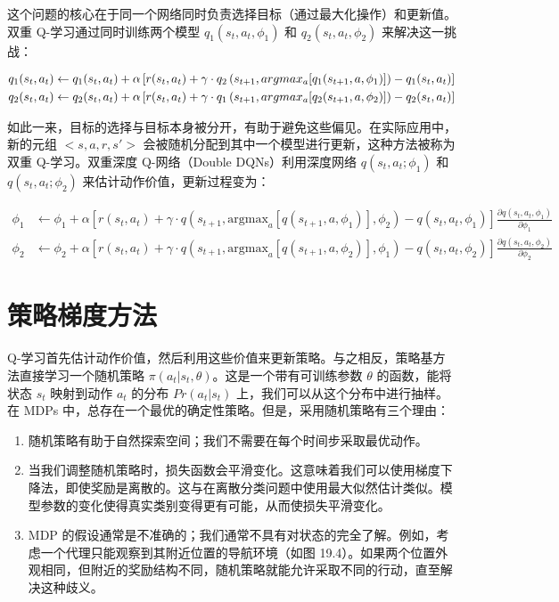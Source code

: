 \documentclass[lang=cn,newtx,10pt,scheme=chinese]{elegantbook}
\begin{document}
这个问题的核心在于同一个网络同时负责选择目标（通过最大化操作）和更新值。双重 Q-学习通过同时训练两个模型 \(q_1(s_t, a_t, \phi_1)\) 和 \(q_2(s_t, a_t, \phi_2)\) 来解决这一挑战：


\begin{align}
&q_1(s_t, a_t) \leftarrow q_1(s_t, a_t) + \alpha \left[ r(s_t, a_t) + \gamma \cdot q_2 \left( s_{t+1}, argmax_{a} [q_1(s_{t+1}, a, \phi_1)] \right) - q_1(s_t, a_t) \right] \notag\\
&q_2(s_t, a_t) \leftarrow q_2(s_t, a_t) + \alpha \left[ r(s_t, a_t) + \gamma \cdot q_1 \left( s_{t+1}, argmax_{a} [q_2(s_{t+1}, a, \phi_2)] \right) - q_2(s_t, a_t) \right] 
\end{align} 



如此一来，目标的选择与目标本身被分开，有助于避免这些偏见。在实际应用中，新的元组 \(<s, a, r, s'>\) 会被随机分配到其中一个模型进行更新，这种方法被称为双重 Q-学习。双重深度 Q-网络（Double DQNs）利用深度网络 \(q(s_t, a_t; \phi_1)\) 和 \(q(s_t, a_t; \phi_2)\) 来估计动作价值，更新过程变为：

\begin{equation}
\begin{aligned}
\phi_1 &\leftarrow \phi_1 + \alpha \left[ r(s_t, a_t) + \gamma \cdot q \left( s_{t+1}, \text{argmax}_a [q(s_{t+1}, a, \phi_1)], \phi_2 \right) - q(s_t, a_t, \phi_1) \right] \frac{\partial q(s_t, a_t, \phi_1)}{\partial \phi_1} \\
\phi_2 &\leftarrow \phi_2 + \alpha \left[ r(s_t, a_t) + \gamma \cdot q \left( s_{t+1}, \text{argmax}_a [q(s_{t+1}, a, \phi_2)], \phi_1 \right) - q(s_t, a_t, \phi_2) \right] \frac{\partial q(s_t, a_t, \phi_2)}{\partial \phi_2}
\end{aligned} 
\end{equation}


\section{策略梯度方法}
Q-学习首先估计动作价值，然后利用这些价值来更新策略。与之相反，策略基方法直接学习一个随机策略 \(\pi(a_t|s_t, \theta)\)。这是一个带有可训练参数 \(\theta\) 的函数，能将状态 \(s_t\) 映射到动作 \(a_t\) 的分布 \(Pr(a_t|s_t)\) 上，我们可以从这个分布中进行抽样。在 MDPs 中，总存在一个最优的确定性策略。但是，采用随机策略有三个理由：

\begin{enumerate}
\item 随机策略有助于自然探索空间；我们不需要在每个时间步采取最优动作。
\item 当我们调整随机策略时，损失函数会平滑变化。这意味着我们可以使用梯度下降法，即使奖励是离散的。这与在离散分类问题中使用最大似然估计类似。模型参数的变化使得真实类别变得更有可能，从而使损失平滑变化。
\item MDP 的假设通常是不准确的；我们通常不具有对状态的完全了解。例如，考虑一个代理只能观察到其附近位置的导航环境（如图 19.4）。如果两个位置外观相同，但附近的奖励结构不同，随机策略就能允许采取不同的行动，直至解决这种歧义。
\end{enumerate}
\end{document}
